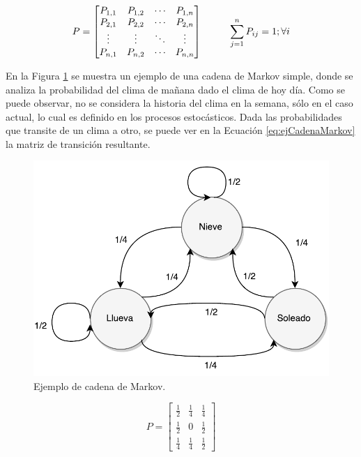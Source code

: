 \begin{equation} \label{eq:matrizTransicion}
	P =
	\begin{bmatrix}
		P_{1,1} & P_{1,2} & \cdots & P_{1,n} \\
		P_{2,1} & P_{2,2} & \cdots & P_{2,n} \\
		\vdots  & \vdots  & \ddots & \vdots  \\
		P_{n,1} & P_{n,2} & \cdots & P_{n,n} \\
	\end{bmatrix}
	\hspace*{1cm} \sum_{j=1}^{n} P_{ij} = 1 ; \forall i
\end{equation}

En la Figura \ref{fig:ejCadenaMarkov} se muestra un ejemplo de una cadena de Markov simple, donde se analiza la probabilidad del clima de mañana dado el clima de hoy día. Como se puede observar, no se considera la historia del clima en la semana, sólo en el caso actual, lo cual es definido en los procesos estocásticos. Dada las probabilidades que transite de un clima a otro, se puede ver en la Ecuación \ref{eq:ejCadenaMarkov} la matriz de transición resultante.

\begin{figure}[hb!]
	\centering
	\includegraphics[scale=0.5]{images/EjCadenaMarkov.pdf}
	\caption{Ejemplo de cadena de Markov.}
	\label{fig:ejCadenaMarkov}
\end{figure}

\begin{equation} \label{eq:ejCadenaMarkov}
	P =
	\begin{bmatrix}
		\frac{1}{2} & \frac{1}{4} & \frac{1}{4} \\
		\frac{1}{2} & 0 & \frac{1}{2} \\
		\frac{1}{4} & \frac{1}{4} & \frac{1}{2}
	\end{bmatrix}	
\end{equation}

